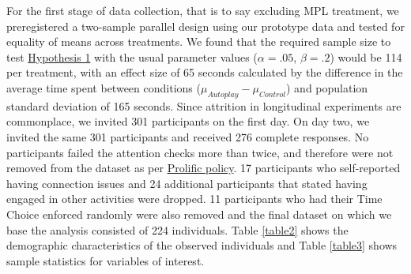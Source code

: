 \documentclass[11pt,a4paper,oneside]{article}
\begin{document}
For the first stage of data collection, that is to say excluding MPL treatment, we preregistered a two-sample parallel design using our prototype data and tested for equality of means across treatments. We found that the required  sample size to test \hyperref[hypotheses]{Hypothesis 1} with the usual parameter values ($\alpha = .05$, $\beta = .2$) would be 114 per treatment, with an effect size of 65 seconds calculated by the difference in the average time spent between conditions ($\mu_{Autoplay}-\mu_{Control}$) and population standard deviation of 165 seconds. Since attrition in longitudinal experiments are commonplace, we invited 301 participants on the first day. On day two, we invited the same 301 participants and received 276 complete responses. No participants failed the attention checks more than twice, and therefore were not removed from the dataset as per \href{https://researcher-help.prolific.co/hc/en-gb/articles/360009223553-Prolific-s-Attention-and-Comprehension-Check-Policy}{Prolific policy}. 17 participants who self-reported having connection issues and 24 additional participants that stated having engaged in other activities were dropped. 11 participants who had their Time Choice enforced randomly were also removed and the final dataset on which we base the analysis consisted of 224 individuals. Table \ref{table2} shows the demographic characteristics of the observed individuals and Table \ref{table3} shows sample statistics for variables of interest.
\end{document}
